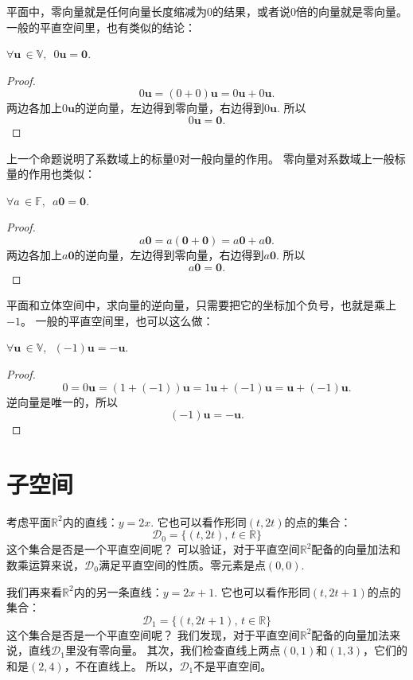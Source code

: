 \documentclass[12pt,UTF8]{ctexbook}
\begin{document}
平面中，零向量就是任何向量长度缩减为0的结果，或者说0倍的向量就是零向量。
一般的平直空间里，也有类似的结论：
\begin{pp}\label{pp:1_3}
    $\forall \mathbf{u} \, \in \mathbb{V}, \,\,\, 0 \mathbf{u} = \mathbf{0}.$
\end{pp} 
\begin{proof} %
    $$ 0\mathbf{u} = (0 + 0)\mathbf{u} = 0\mathbf{u} + 0\mathbf{u}.$$
    两边各加上$0\mathbf{u}$的逆向量，左边得到零向量，右边得到$0\mathbf{u}$. 所以
    $$ 0\mathbf{u} = \mathbf{0}.$$
\end{proof}
 

上一个命题说明了系数域上的标量0对一般向量的作用。
零向量对系数域上一般标量的作用也类似：
\begin{pp}\label{pp:1_4}
    $\forall a \, \in \mathbb{F}, \,\,\, a \mathbf{0} = \mathbf{0}.$
\end{pp} 
\begin{proof} %
    $$ a\mathbf{0} = a(\mathbf{0}+\mathbf{0}) = a\mathbf{0}+a\mathbf{0}.$$
    两边各加上$a\mathbf{0}$的逆向量，左边得到零向量，右边得到$a\mathbf{0}$. 所以
    $$ a\mathbf{0} = \mathbf{0}.$$
\end{proof}
  

平面和立体空间中，求向量的逆向量，只需要把它的坐标加个负号，也就是乘上$-1$。
一般的平直空间里，也可以这么做：
\begin{pp}\label{pp:1_5}
    $\forall \mathbf{u} \, \in \mathbb{V}, \,\,\, (-1) \mathbf{u} = -\mathbf{u}.$
\end{pp} 
\begin{proof} %
    $$ 0 = 0\mathbf{u} = (1 + (-1))\mathbf{u} = 1\mathbf{u} + (-1)\mathbf{u} = \mathbf{u} + (-1)\mathbf{u}.$$
    逆向量是唯一的，所以
    $$ (-1)\mathbf{u} = -\mathbf{u}.$$
\end{proof}
 

\section{子空间}
考虑平面$\mathbb{R}^2$内的直线：$y = 2x.$ 它也可以看作形同$(t, 2t)$的点的集合：
$$ \mathcal{D}_0 = \{ (t, 2t), \, t \in \mathbb{R}\}$$
这个集合是否是一个平直空间呢？
可以验证，对于平直空间$\mathbb{R}^2$配备的向量加法和数乘运算来说，$\mathcal{D}_0$满足平直空间的性质。零元素是点$(0,0)$.

我们再来看$\mathbb{R}^2$内的另一条直线：$y = 2x + 1$. 它也可以看作形同$(t, 2t + 1)$的点的集合：
$$ \mathcal{D}_1 = \{ (t, 2t + 1), \, t \in \mathbb{R}\}$$
这个集合是否是一个平直空间呢？
我们发现，对于平直空间$\mathbb{R}^2$配备的向量加法来说，直线$\mathcal{D}_1$里没有零向量。
其次，我们检查直线上两点$(0,1)$和$(1,3)$，它们的和是$(2,4)$，不在直线上。
所以，$\mathcal{D}_1$不是平直空间。
\end{document}
